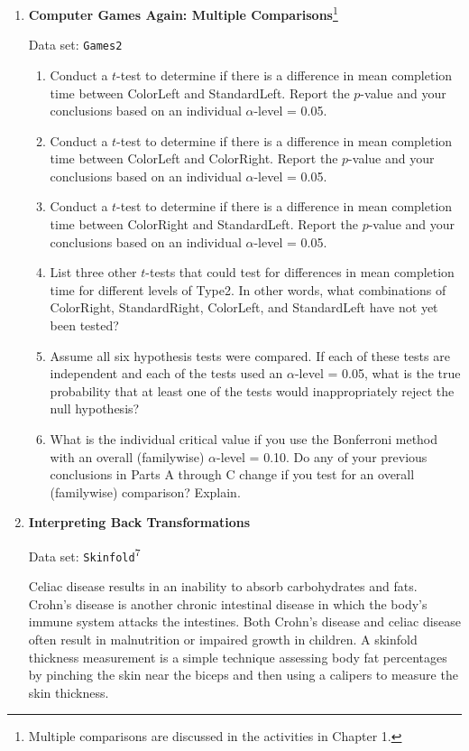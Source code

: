 \documentclass[
]{book}
\begin{document}
\begin{enumerate}
  \item \textbf{Computer Games Again: Multiple Comparisons}\footnote{Multiple comparisons are discussed in the activities in Chapter 1.}

Data set: \texttt{Games2}

  \begin{enumerate}
    \item Conduct a $t$-test to determine if there is a difference in mean completion time between ColorLeft and StandardLeft. Report the $p$-value and your conclusions based on an individual $\alpha$-level = 0.05.
      \item Conduct a $t$-test to determine if there is a difference in mean completion time between ColorLeft and ColorRight. Report the $p$-value and your conclusions based on an individual $\alpha$-level = 0.05.
      \item Conduct a $t$-test to determine if there is a difference in mean completion time between ColorRight and StandardLeft. Report the $p$-value and your conclusions based on an individual $\alpha$-level = 0.05.
      \item List three other $t$-tests that could test for differences in mean completion time for different levels of Type2. In other words, what combinations of ColorRight, StandardRight, ColorLeft, and StandardLeft have not yet been tested?
      \item Assume all six hypothesis tests were compared. If each of these tests are independent and each of the tests used an $\alpha$-level = 0.05, what is the true probability that at least one of the tests would inappropriately reject the null hypothesis?
      \item What is the individual critical value if you use the Bonferroni method with an overall (familywise) $\alpha$-level = 0.10. Do any of your previous conclusions in Parts A through C change if you test for an overall (familywise) comparison? Explain.
    \end{enumerate}

  \item \textbf{Interpreting Back Transformations}

Data set: \texttt{Skinfold}\textsuperscript{7}

Celiac disease results in an inability to absorb carbohydrates and fats. Crohn’s disease is another chronic intestinal disease in which the body’s immune system attacks the intestines. Both Crohn’s disease and celiac disease often result in malnutrition or impaired growth in children. A skinfold thickness measurement is a simple technique assessing body fat percentages by pinching the skin near the biceps and then using a calipers to measure the skin thickness.


\end{enumerate}
\end{document}
